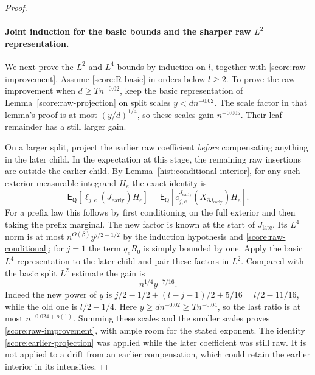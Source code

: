 \begin{proof}
\paragraph{Joint induction for the basic bounds and the sharper raw $L^2$ representation.}
We next prove the $L^2$ and $L^4$ bounds by induction on $l$, together with
\eqref{score:raw-improvement}.  Assume \eqref{score:R-basic} in orders below
$l\ge2$.  To prove the raw improvement when $d\ge Tn^{-0.02}$, keep the
basic representation of Lemma~\ref{score:raw-projection} on split scales
$y<dn^{-0.02}$.  The scale factor in that lemma's proof is at most
$(y/d)^{1/4}$, so these scales gain
$n^{-0.005}$.  Their leaf remainder has a still larger gain.

On a larger split, project the earlier raw coefficient \emph{before}
compensating anything in the later child.  In the expectation at this
stage, the remaining raw insertions are outside the earlier child.  By
Lemma~\ref{hist:conditional-interior}, for any such exterior-measurable
integrand $H_e$ the exact identity is
\begin{equation}\label{score:earlier-projection}
 \mathsf E_{\mathsf Q}[\ell_{j,e}(J_{\mathrm{early}})H_e]
       =\mathsf E_{\mathsf Q}
          [c_{j,e}^{J_{\mathrm{early}}}(X_{\partial J_{\mathrm{early}}})H_e].
\end{equation}
For a prefix law this follows by first conditioning on the full exterior
and then taking the prefix marginal.
The new factor is known at the start of $J_{\mathrm{late}}$.  Its $L^4$ norm is at most
$n^{O(\beta)}y^{j/2-1/2}$ by the induction hypothesis and
\eqref{score:raw-conditional}; for $j=1$ the term $q_eR_0$ is simply
bounded by one.  Apply the basic $L^4$ representation to the later
child and pair these factors in $L^2$.  Compared with the basic split
$L^2$ estimate the gain is
\[
 n^{1/4}y^{-7/16}.
\]
Indeed the new power of $y$ is
$j/2-1/2+(l-j-1)/2+5/16=l/2-11/16$, while the old one is $l/2-1/4$.
Here $y\ge dn^{-0.02}\ge Tn^{-0.04}$, so the last ratio is at most
$n^{-0.024+o(1)}$.  Summing these scales and the smaller scales proves
\eqref{score:raw-improvement}, with ample room for the stated exponent.
The identity \eqref{score:earlier-projection} was applied while the later
coefficient was still raw.  It is not applied to a drift from an earlier
compensation, which could retain the earlier interior in its intensities.


\end{proof}
